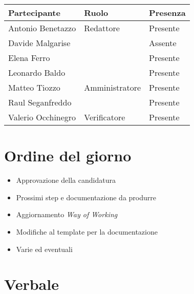 \documentclass[italian,12pt]{article} %
\begin{document}
\begin{flushleft}
	\begin{table}[!h]
		\begin{tabular}{ |l|l|l| }
			\hline
			\textbf{Partecipante} & \textbf{Ruolo}       & \textbf{Presenza} \\
			\hline 
			Antonio Benetazzo     & Redattore            & Presente          \\
			Davide Malgarise      &                      & Assente           \\
			Elena Ferro           &                      & Presente          \\
			Leonardo Baldo        &                      & Presente          \\
			Matteo Tiozzo         & Amministratore       & Presente          \\
			Raul Seganfreddo      &                      & Presente          \\
			Valerio Occhinegro    & Verificatore         & Presente          \\
			\hline
		\end{tabular}
	\end{table}
\end{flushleft}

\section{Ordine del giorno}
\begin{itemize}
	\itemsep0em
	\item Approvazione della candidatura
	\item Prossimi step e documentazione da produrre
	\item Aggiornamento \textit{Way of Working}
	\item Modifiche al template per la documentazione
	\item Varie ed eventuali
\end{itemize}

\newpage

\section{Verbale}
\end{document}
